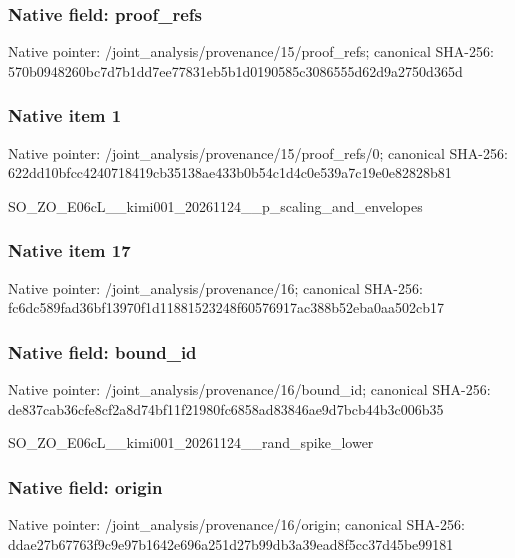 \documentclass[10pt,a4paper]{article}
\begin{document}
\subsubsection{Native field: proof\_refs}


Native pointer: /joint\_analysis/provenan\allowbreak{}ce/15/proof\_refs; canonical SHA-256: 570b0948260bc7d7b1dd7ee7\allowbreak{}7831eb5b1d0190585c308655\allowbreak{}5d62d9a2750d365d



\subsubsection{Native item 1}


Native pointer: /joint\_analysis/provenan\allowbreak{}ce/15/proof\_refs/0; canonical SHA-256: 622dd10bfcc4240718419cb3\allowbreak{}5138ae433b0b54c1d4c0e539\allowbreak{}a7c19e0e82828b81


SO\_ZO\_E06cL\_\_kimi001\_202\allowbreak{}61124\_\_p\_scaling\_and\_env\allowbreak{}elopes


\subsubsection{Native item 17}


Native pointer: /joint\_analysis/provenance/16; canonical SHA-256: fc6dc589fad36bf13970f1d1\allowbreak{}1881523248f60576917ac388\allowbreak{}b52eba0aa502cb17



\subsubsection{Native field: bound\_id}


Native pointer: /joint\_analysis/provenance/16/bound\_id; canonical SHA-256: de837cab36cfe8cf2a8d74bf\allowbreak{}11f21980fc6858ad83846ae9\allowbreak{}d7bcb44b3c006b35


SO\_ZO\_E06cL\_\_kimi001\_202\allowbreak{}61124\_\_rand\_spike\_lower


\subsubsection{Native field: origin}


Native pointer: /joint\_analysis/provenance/16/origin; canonical SHA-256: ddae27b67763f9c9e97b1642\allowbreak{}e696a251d27b99db3a39ead8\allowbreak{}f5cc37d45be99181
\end{document}
